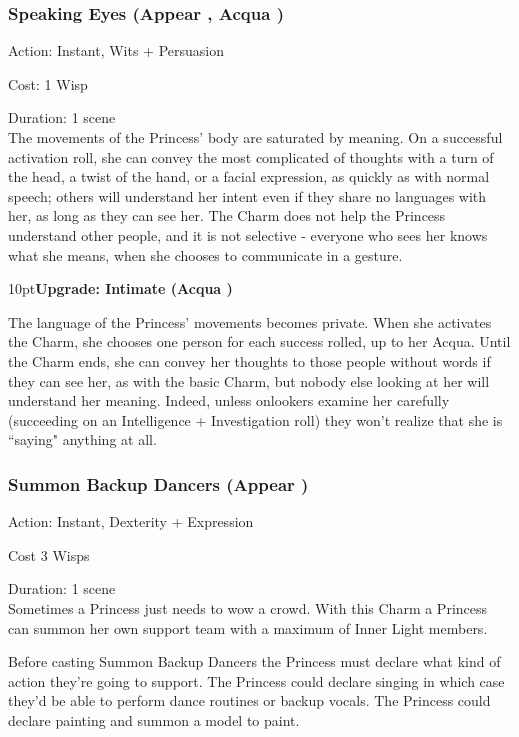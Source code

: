 \subsubsection*{Speaking Eyes (Appear \textbullet\textbullet, Acqua \textbullet)}
\noindent Action: Instant, Wits + Persuasion

\noindent Cost: 1 Wisp

\noindent Duration: 1 scene\\

\noindent The movements of the Princess' body are saturated by meaning. On a successful activation roll, she can convey the most complicated of thoughts with a turn of the head, a twist of the hand, or a facial expression, as quickly as with normal speech; others will understand her intent even if they share no languages with her, as long as they can see her. The Charm does not help the Princess understand other people, and it is not selective - everyone who sees her knows what she means, when she chooses to communicate in a gesture.

\begin{myindentpar}{10pt}\textbf{Upgrade: Intimate (Acqua \textbullet\textbullet)}

The language of the Princess' movements becomes private. When she activates the Charm, she chooses one person for each success rolled, up to her Acqua. Until the Charm ends, she can convey her thoughts to those people without words if they can see her, as with the basic Charm, but nobody else looking at her will understand her meaning. Indeed, unless onlookers examine her carefully (succeeding on an Intelligence + Investigation roll) they won't realize that she is \textquotedblleft saying" anything at all.\end{myindentpar}  


\subsubsection*{Summon Backup Dancers (Appear \textbullet\textbullet\textbullet)}
\noindent Action: Instant, Dexterity + Expression

\noindent Cost 3 Wisps

\noindent Duration: 1 scene \\

\noindent Sometimes a Princess just needs to wow a crowd. With this Charm a Princess can summon her own support team with a maximum of Inner Light members.

Before casting Summon Backup Dancers the Princess must declare what kind of action they're going to support. The Princess could declare singing in which case they'd be able to perform dance routines or backup vocals. The Princess could declare painting and summon a model to paint.

